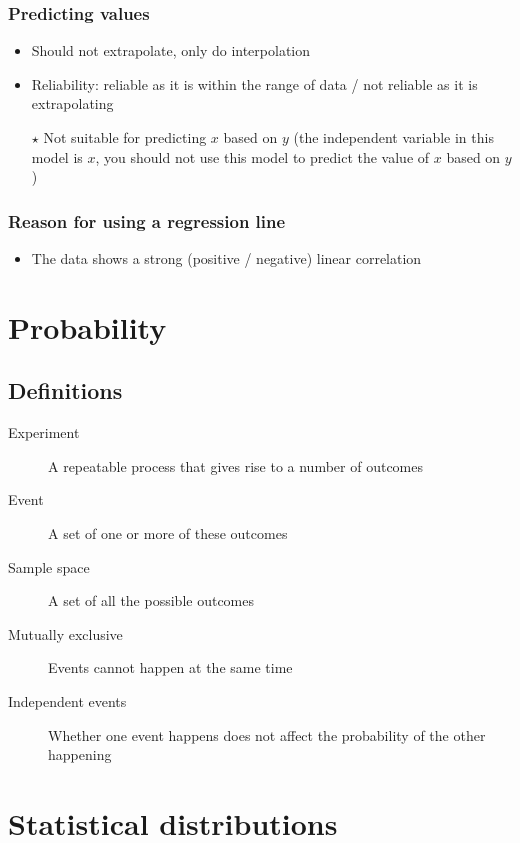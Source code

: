 \documentclass[oneside,fleqn,11pt]{book}
\begin{document}
	\subsection{Predicting values}
	\begin{itemize}
		\item Should not extrapolate, only do interpolation
		\item Reliability: reliable as it is within the range of data / not reliable as it is extrapolating
		\item[$\star$] Not suitable for predicting $x$ based on $y$ (the independent variable in this model is $x$, you should not use this model to predict the value of $x$ based on $y$)
	\end{itemize}
	
	\subsection{Reason for using a regression line}
	\begin{itemize}
		\item The data shows a strong (positive / negative) linear correlation
	\end{itemize}
	
	\pagebreak
	
	
	\chapter{Probability}
	\section{Definitions}
	\begin{description}
		\item[Experiment] A repeatable process that gives rise to a number of outcomes
		\item[Event] A set of one or more of these outcomes
		\item[Sample space] A set of all the possible outcomes
		\item[Mutually exclusive] Events cannot happen at the same time
		\item[Independent events] Whether one event happens does not affect the probability of the other happening
	\end{description}
	
	\pagebreak
	
	
	
	\chapter{Statistical distributions}
\end{document}
